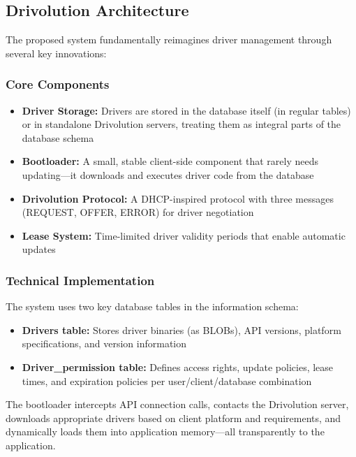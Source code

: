 \subsection{Drivolution Architecture}

The proposed system fundamentally reimagines driver management through several key innovations:

\subsubsection{Core Components}

\begin{itemize}
    \item \textbf{Driver Storage:} Drivers are stored in the database itself (in regular tables) or in standalone Drivolution servers, treating them as integral parts of the database schema
    \item \textbf{Bootloader:} A small, stable client-side component that rarely needs updating—it downloads and executes driver code from the database
    \item \textbf{Drivolution Protocol:} A DHCP-inspired protocol with three messages (REQUEST, OFFER, ERROR) for driver negotiation
    \item \textbf{Lease System:} Time-limited driver validity periods that enable automatic updates
\end{itemize}

\subsubsection{Technical Implementation}

The system uses two key database tables in the information schema:

\begin{itemize}
    \item \textbf{Drivers table:} Stores driver binaries (as BLOBs), API versions, platform specifications, and version information
    \item \textbf{Driver\_permission table:} Defines access rights, update policies, lease times, and expiration policies per user/client/database combination
\end{itemize}

The bootloader intercepts API connection calls, contacts the Drivolution server, downloads appropriate drivers based on client platform and requirements, and dynamically loads them into application memory—all transparently to the application.

